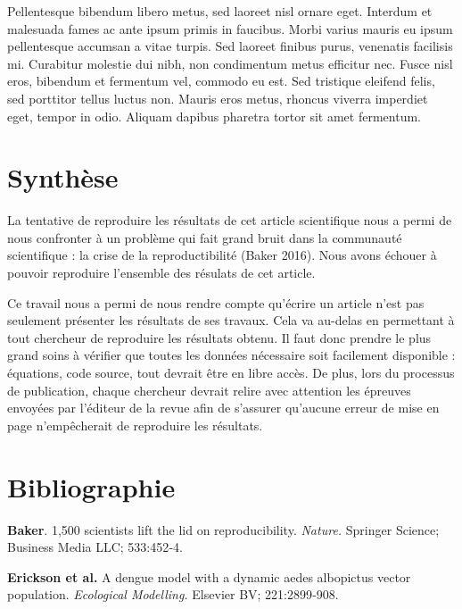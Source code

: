 \documentclass[
  12pt,
  french,
  oneside]{article}
\begin{document}
Pellentesque bibendum libero metus, sed laoreet nisl ornare eget.
Interdum et malesuada fames ac ante ipsum primis in faucibus. Morbi
varius mauris eu ipsum pellentesque accumsan a vitae turpis. Sed laoreet
finibus purus, venenatis facilisis mi. Curabitur molestie dui nibh, non
condimentum metus efficitur nec. Fusce nisl eros, bibendum et fermentum
vel, commodo eu est. Sed tristique eleifend felis, sed porttitor tellus
luctus non. Mauris eros metus, rhoncus viverra imperdiet eget, tempor in
odio. Aliquam dapibus pharetra tortor sit amet fermentum.

\hypertarget{synthuxe8se}{%
\section{Synthèse}\label{synthuxe8se}}

La tentative de reproduire les résultats de cet article scientifique
nous a permi de nous confronter à un problème qui fait grand bruit dans
la communauté scientifique : la crise de la reproductibilité (Baker
2016). Nous avons échouer à pouvoir reproduire l'ensemble des résulats
de cet article.

Ce travail nous a permi de nous rendre compte qu'écrire un article n'est
pas seulement présenter les résultats de ses travaux. Cela va au-delas
en permettant à tout chercheur de reproduire les résultats obtenu. Il
faut donc prendre le plus grand soins à vérifier que toutes les données
nécessaire soit facilement disponible : équations, code source, tout
devrait être en libre accès. De plus, lors du processus de publication,
chaque chercheur devrait relire avec attention les épreuves envoyées par
l'éditeur de la revue afin de s'assurer qu'aucune erreur de mise en page
n'empêcherait de reproduire les résultats.

\hypertarget{bibliographie}{%
\section*{Bibliographie}\label{bibliographie}}

\hypertarget{refs}{}
\leavevmode\hypertarget{ref-Baker_2016}{}%
\textbf{Baker}. 1,500 scientists lift the lid on reproducibility.
\emph{Nature.} Springer Science; Business Media LLC; 533:452‑4.

\leavevmode\hypertarget{ref-Erickson_2010}{}%
\textbf{Erickson et al.} A dengue model with a dynamic aedes albopictus
vector population. \emph{Ecological Modelling.} Elsevier BV;
221:2899‑908.
\end{document}
